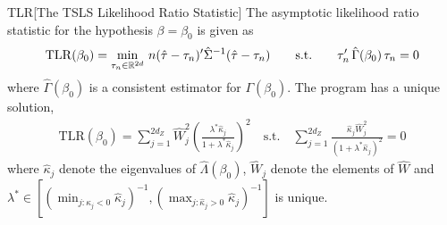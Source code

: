 \begin{propositionp}{TLR}[The TSLS Likelihood Ratio Statistic] \label{prop:tlr}
The asymptotic likelihood ratio statistic for the hypothesis \(\beta=\beta_0\) is given as
\begin{align*}
\mathrm{TLR}(\beta_0) = \min_{\tau_n \in \mathbb{R}^{2d}}\,n(\hat \tau -\tau_n)'\hat\Sigma^{-1}(\hat \tau - \tau_n) \qquad \text{s.t.} \qquad \tau_n'\,\hat\Gamma(\beta_0) \,\tau_n = 0
\end{align*}    
where \(\hat\Gamma(\beta_0)\) is a consistent estimator for \(\Gamma(\beta_0)\).
The program has a unique solution, 
    \begin{align*}
    \mathrm{TLR}(\beta_0) = \sum_{j=1}^{2d_Z} \hat W_j^2\!\left(\frac{\lambda^*\hat\kappa_j}{1+\lambda^*\hat\kappa_j}\right)^{\!2}
    \quad\text{s.t.}\quad
    \sum_{j=1}^{2d_Z}\frac{\hat\kappa_j \hat W_j^2}{(1+\lambda^*\hat\kappa_j)^2} = 0
\end{align*}
where \(\hat \kappa_j\) denote the eigenvalues of \(\hat \Lambda(\beta_0)\), \(\hat W_j\) denote the elements of \(\hat W\) and \(\lambda^*\in[(\min_{j:\hat\kappa_j<0}\hat\kappa_j)^{-1},(\max_{j:\hat\kappa_j>0}\hat\kappa_j)^{-1}]\) is unique.
\end{propositionp}

